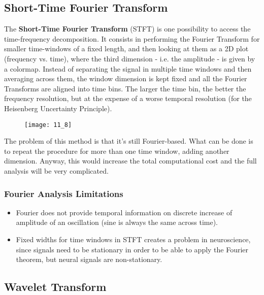 \subsection{Short-Time Fourier Transform}
The \textbf{Short-Time Fourier Transform} (STFT) is one possibility to access the time-frequency decomposition.
It consists in performing the Fourier Transform for smaller time-windows of a fixed length, and then looking
at them as a 2D plot (frequency vs. time), where the third dimension - i.e. the amplitude - is given by a
colormap. Instead of separating the signal in multiple time windows and then averaging across them, the window
dimension is kept fixed and all the Fourier Transforms are aligned into time bins. The larger the time bin,
the better the frequency resolution, but at the expense of a worse temporal resolution (for the
Heisenberg Uncertainty Principle).
\begin{figure}[H]
    \texttt{[image: 11\_8]}
    \centering
\end{figure}
The problem of this method is that it's still Fourier-based. What can be done is to repeat the procedure for
more than one time window, adding another dimension. Anyway, this would increase the total computational cost
and the full analysis will be very complicated.
\subsubsection{Fourier Analysis Limitations}
\begin{itemize}
    \item Fourier does not provide temporal information on discrete increase of amplitude of an oscillation
          (sine is always the same across time).
    \item Fixed widths for time windows in STFT creates a problem in neuroscience, since signals need to be
          stationary in order to be able to apply the Fourier theorem, but neural signals are non-stationary.
\end{itemize}

\subsection{Wavelet Transform}
